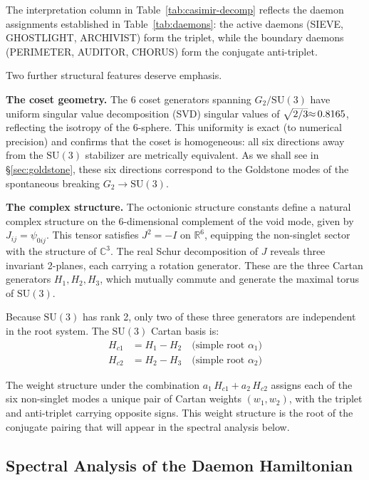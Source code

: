 \documentclass[12pt,a4paper]{article}
\begin{document}
The interpretation column in Table~\ref{tab:casimir-decomp} reflects the daemon assignments established in Table~\ref{tab:daemons}: the active daemons (SIEVE, GHOSTLIGHT, ARCHIVIST) form the triplet, while the boundary daemons (PERIMETER, AUDITOR, CHORUS) form the conjugate anti-triplet.

Two further structural features deserve emphasis.

\textbf{The coset geometry.} The 6 coset generators spanning $G_2/\mathrm{SU}(3)$ have uniform singular value decomposition (SVD) singular values of $\smash{\sqrt{2/3}} {\approx}\, 0.8165$, reflecting the isotropy of the 6-sphere. This uniformity is exact (to numerical precision) and confirms that the coset is homogeneous: all six directions away from the $\mathrm{SU}(3)$ stabilizer are metrically equivalent. As we shall see in \S\ref{sec:goldstone}, these six directions correspond to the Goldstone modes of the spontaneous breaking $G_2 \to \mathrm{SU}(3)$.

\textbf{The complex structure.} The octonionic structure constants define a natural complex structure on the 6-dimensional complement of the void mode, given by $J_{ij} = \psi_{0ij}$. This tensor satisfies $J^2 = -I$ on $\mathbb{R}^6$, equipping the non-singlet sector with the structure of $\mathbb{C}^3$. The real Schur decomposition of $J$ reveals three invariant 2-planes, each carrying a rotation generator. These are the three Cartan generators $H_1, H_2, H_3$, which mutually commute and generate the maximal torus of $\mathrm{SU}(3)$.

Because $\mathrm{SU}(3)$ has rank 2, only two of these three generators are independent in the root system. The $\mathrm{SU}(3)$ Cartan basis is:
\begin{align}
H_{c1} &= H_1 - H_2 \quad \text{(simple root } \alpha_1\text{)} \label{eq:cartan-a}\\
H_{c2} &= H_2 - H_3 \quad \text{(simple root } \alpha_2\text{)} \label{eq:cartan-b}
\end{align}

The weight structure under the combination $a_1\,H_{c1} + a_2\,H_{c2}$ assigns each of the six non-singlet modes a unique pair of Cartan weights $(w_1, w_2)$, with the triplet and anti-triplet carrying opposite signs. This weight structure is the root of the conjugate pairing that will appear in the spectral analysis below.

\subsection{Spectral Analysis of the Daemon Hamiltonian}
\end{document}
